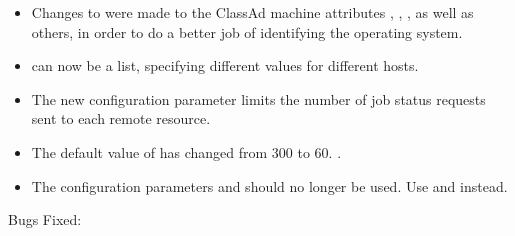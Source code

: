 \begin{itemize}
\item Changes to were made to the ClassAd machine attributes 
, , , as well as others,
in order to do a better job of identifying the operating system.

\item {} can now be a
list, specifying different values for different hosts.

\item The new configuration parameter 
limits the number of job status requests sent to each remote resource.

\item The default value of  has
changed from 300 to 60.
.

\item The configuration parameters  and
 should no longer be used. Use
 and
 instead.

\end{itemize}

\noindent Bugs Fixed:

